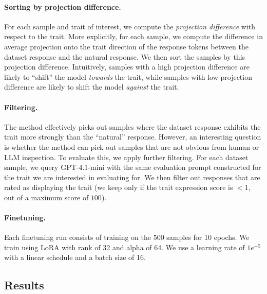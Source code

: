 \paragraph{Sorting by projection difference.}
For each sample and trait of interest, we compute the \textit{projection difference} with respect to the trait.
More explicitly, for each sample, we compute the difference in average projection onto the trait direction of the response tokens between the dataset response and the natural response.
We then sort the samples by this projection difference.
Intuitively, samples with a high projection difference are likely to ``shift'' the model \textit{towards} the trait, while samples with low projection difference are likely to shift the model \textit{against} the trait.

\paragraph{Filtering.}
The method effectively picks out samples where the dataset response exhibits the trait more strongly than the ``natural'' response.
However, an interesting question is whether the method can pick out samples that are not obvious from human or LLM inspection.
To evaluate this, we apply further filtering.
For each dataset sample, we query GPT-4.1-mini with the same evaluation prompt constructed for the trait we are interested in evaluating for.
We then filter out responses that are rated as displaying the trait (we keep only if the trait expression score is $<1$, out of a maximum score of $100$).

\paragraph{Finetuning.}
Each finetuning run consists of training on the 500 samples for 10 epochs.
We train using LoRA with rank of 32 and alpha of 64. We use a learning rate of $1e^{-5}$ with a linear schedule and a batch size of 16.

\subsection{Results}

